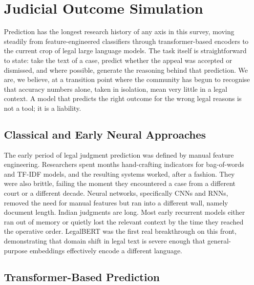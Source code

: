 \section{Judicial Outcome Simulation}

Prediction has the longest research history of any axis in this survey, moving steadily from feature-engineered classifiers through transformer-based encoders to the current crop of legal large language models. The task itself is straightforward to state: take the text of a case, predict whether the appeal was accepted or dismissed, and where possible, generate the reasoning behind that prediction. We are, we believe, at a transition point where the community has begun to recognise that accuracy numbers alone, taken in isolation, mean very little in a legal context. A model that predicts the right outcome for the wrong legal reasons is not a tool; it is a liability.

\subsection{Classical and Early Neural Approaches}

The early period of legal judgment prediction was defined by manual feature engineering. Researchers spent months hand-crafting indicators for bag-of-words and TF-IDF models, and the resulting systems worked, after a fashion. They were also brittle, failing the moment they encountered a case from a different court or a different decade. Neural networks, specifically CNNs and RNNs, removed the need for manual features but ran into a different wall, namely document length. Indian judgments are long. Most early recurrent models either ran out of memory or quietly lost the relevant context by the time they reached the operative order. LegalBERT was the first real breakthrough on this front, demonstrating that domain shift in legal text is severe enough that general-purpose embeddings effectively encode a different language.

\subsection{Transformer-Based Prediction}

